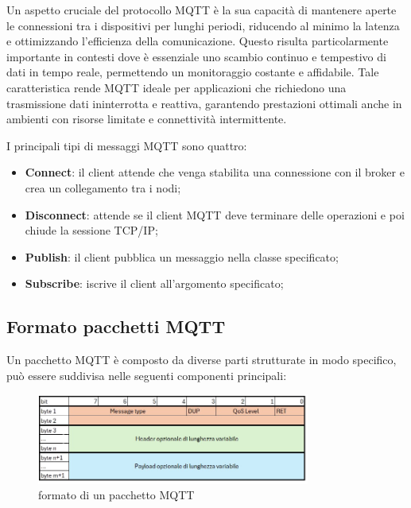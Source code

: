 \documentclass[12pt,a4paper,openright,twoside]{book}
\begin{document}
Un aspetto cruciale del protocollo MQTT è la sua capacità di mantenere aperte le connessioni tra i dispositivi per lunghi periodi, riducendo al minimo la latenza 
e ottimizzando l'efficienza della comunicazione. Questo risulta particolarmente importante in contesti dove è essenziale uno scambio continuo e tempestivo di dati 
in tempo reale, permettendo un monitoraggio costante e affidabile. Tale caratteristica rende MQTT ideale per applicazioni che richiedono una trasmissione dati 
ininterrotta e reattiva, garantendo prestazioni ottimali anche in ambienti con risorse limitate e connettività intermittente.

I principali tipi di messaggi MQTT sono quattro:
\begin{itemize}
    \item \textbf{Connect}: il client attende che venga stabilita una connessione con il broker e crea un collegamento tra i nodi;
    \item \textbf{Disconnect}: attende se il client MQTT deve terminare delle operazioni e poi chiude la sessione TCP/IP;
    \item \textbf{Publish}: il client pubblica un messaggio nella classe specificato;
    \item \textbf{Subscribe}: iscrive il client all’argomento specificato;
\end{itemize}

\subsection{Formato pacchetti MQTT}
Un pacchetto \ac{MQTT} è composto da diverse parti strutturate in modo specifico, può essere suddivisa nelle seguenti componenti principali:

\begin{figure}[H]
    \centering
    \includegraphics[width=0.8\textwidth]{figures/mqtt-packet.png}
    \caption{formato di un pacchetto MQTT}
    \label{fig:mqtt-packet}
\end{figure}
\end{document}
